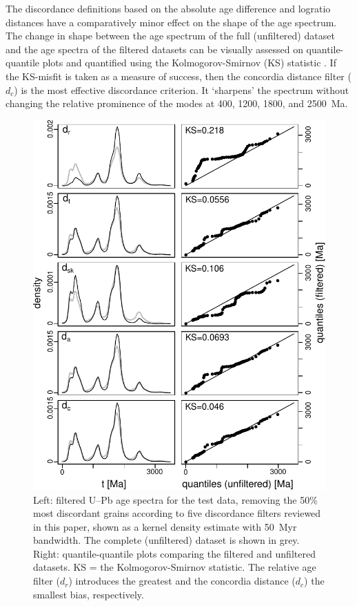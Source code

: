 \documentclass{article}
\begin{document}
The discordance definitions based on the absolute age difference and
logratio distances have a comparatively minor effect on the shape of
the age spectrum. The change in shape between the age spectrum of the
full (unfiltered) dataset and the age spectra of the filtered datasets
can be visually assessed on quantile-quantile plots and quantified
using the Kolmogorov-Smirnov (KS) statistic \citep{vermeesch2013}.  If
the KS-misfit is taken as a measure of success, then the concordia
distance filter ($d_c$) is the most effective discordance
criterion. It `sharpens' the spectrum without changing the relative
prominence of the modes at 400, 1200, 1800, and 2500~Ma.

\begin{figure}[t]
  \includegraphics[width=12cm]{KDEs.pdf}
  \caption{Left: filtered U--Pb age spectra for the test data,
    removing the 50\% most discordant grains according to five
    discordance filters reviewed in this paper, shown as a kernel
    density estimate with 50~Myr bandwidth. The complete (unfiltered)
    dataset is shown in grey. Right: quantile-quantile plots comparing
    the filtered and unfiltered datasets. KS = the Kolmogorov-Smirnov
    statistic. The relative age filter ($d_r$) introduces the greatest
    and the concordia distance ($d_c$) the smallest bias,
    respectively.}
  \label{fig:KDEs}
\end{figure}
\end{document}
